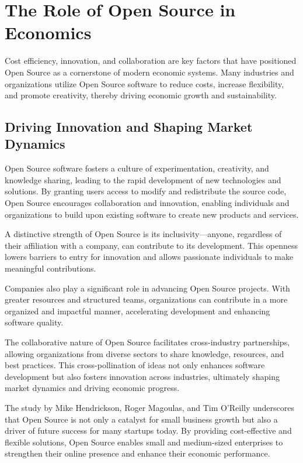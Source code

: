 \cite{OpenSource-Software-Risks-ConnectWise}




\section{The Role of Open Source in Economics}

Cost efficiency, innovation, and collaboration are key factors that have positioned Open Source as a cornerstone of modern economic systems. Many industries and organizations utilize Open Source software to reduce costs, increase flexibility, 
and promote creativity, thereby driving economic growth and sustainability.

\subsection{Driving Innovation and Shaping Market Dynamics}

Open Source software fosters a culture of experimentation, creativity, and knowledge sharing, 
leading to the rapid development of new technologies and solutions. By granting users access to modify and redistribute the source code, 
Open Source encourages collaboration and innovation, 
enabling individuals and organizations to build upon existing software to create new products and services.

A distinctive strength of Open Source is its inclusivity—anyone, regardless of their affiliation with a company,
can contribute to its development. 
This openness lowers barriers to entry for innovation and allows passionate individuals to make meaningful contributions.

Companies also play a significant role in advancing Open Source projects. 
With greater resources and structured teams, organizations can contribute in a more organized and impactful manner, 
accelerating development and enhancing software quality.

The collaborative nature of Open Source facilitates cross-industry partnerships, 
allowing organizations from diverse sectors to share knowledge, resources, and best practices. 
This cross-pollination of ideas not only enhances software development but also fosters innovation across industries, 
ultimately shaping market dynamics and driving economic progress.

The study \cite{opensource_hendrickson2012economic} by Mike Hendrickson, Roger Magoulas, 
and Tim O'Reilly underscores that Open Source is not only a catalyst for small business growth but also a driver of future success for many startups today. 
By providing cost-effective and flexible solutions,
Open Source enables small and medium-sized enterprises to strengthen their online presence and enhance their economic performance.


